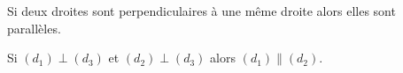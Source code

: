 Si deux droites sont perpendiculaires à une même droite alors elles sont parallèles.
\begin{center}
    Si $(d_1)\perp(d_3)$ et $(d_2)\perp(d_3)$ alors $(d_1)\parallel(d_2)$.
\end{center}